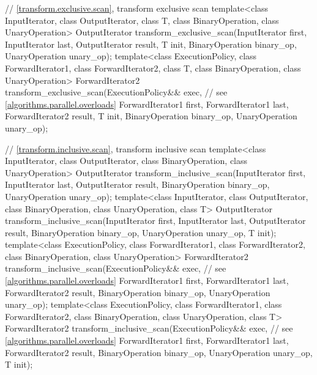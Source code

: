 \begin{codeblock}
{  // \ref{transform.exclusive.scan}, transform exclusive scan
  template<class InputIterator, class OutputIterator, class T,
           class BinaryOperation, class UnaryOperation>
    OutputIterator
      transform_exclusive_scan(InputIterator first, InputIterator last,
                               OutputIterator result, T init,
                               BinaryOperation binary_op, UnaryOperation unary_op);
  template<class ExecutionPolicy, class ForwardIterator1, class ForwardIterator2, class T,
           class BinaryOperation, class UnaryOperation>
    ForwardIterator2
      transform_exclusive_scan(ExecutionPolicy&& exec,          // see \ref{algorithms.parallel.overloads}
                               ForwardIterator1 first, ForwardIterator1 last,
                               ForwardIterator2 result, T init,
                               BinaryOperation binary_op, UnaryOperation unary_op);

  // \ref{transform.inclusive.scan}, transform inclusive scan
  template<class InputIterator, class OutputIterator,
           class BinaryOperation, class UnaryOperation>
    OutputIterator
      transform_inclusive_scan(InputIterator first, InputIterator last,
                               OutputIterator result,
                               BinaryOperation binary_op, UnaryOperation unary_op);
  template<class InputIterator, class OutputIterator,
           class BinaryOperation, class UnaryOperation, class T>
    OutputIterator
      transform_inclusive_scan(InputIterator first, InputIterator last,
                               OutputIterator result,
                               BinaryOperation binary_op, UnaryOperation unary_op, T init);
  template<class ExecutionPolicy, class ForwardIterator1, class ForwardIterator2,
           class BinaryOperation, class UnaryOperation>
    ForwardIterator2
      transform_inclusive_scan(ExecutionPolicy&& exec,          // see \ref{algorithms.parallel.overloads}
                               ForwardIterator1 first, ForwardIterator1 last,
                               ForwardIterator2 result, BinaryOperation binary_op,
                               UnaryOperation unary_op);
  template<class ExecutionPolicy, class ForwardIterator1, class ForwardIterator2,
           class BinaryOperation, class UnaryOperation, class T>
    ForwardIterator2
      transform_inclusive_scan(ExecutionPolicy&& exec,          // see \ref{algorithms.parallel.overloads}
                               ForwardIterator1 first, ForwardIterator1 last,
                               ForwardIterator2 result,
                               BinaryOperation binary_op, UnaryOperation unary_op, T init);

}
\end{codeblock}
